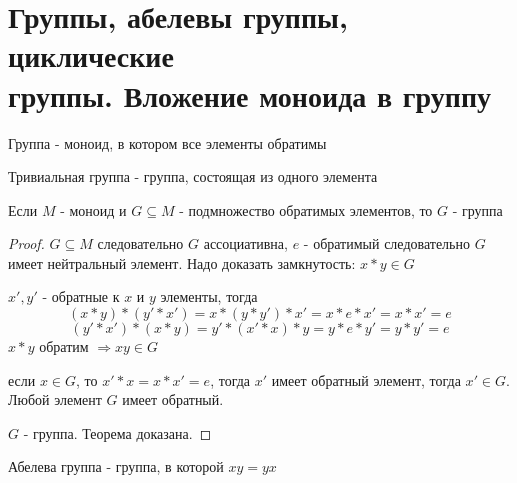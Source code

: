 \documentclass[../main/document.tex]{subfiles}
\begin{document}
\section{Группы, абелевы группы, циклические\\ группы. Вложение моноида в группу}
\begin{dfn}[Группа]
Группа - моноид, в котором все элементы обратимы
\end{dfn}
\begin{dfn}
Тривиальная группа - группа, состоящая из одного элемента
\end{dfn}
\begin{thm}
Если $M$ - моноид и $G\subseteq M$ - подмножество обратимых элементов, то $G$ - группа
\begin{proof}
$G\subseteq M$ следовательно $G$ ассоциативна, 
$e$ - обратимый следовательно $G$ имеет нейтральный элемент. 
Надо доказать замкнутость: $x*y\in G$

$x',y'$ - обратные к $x$ и $y$ элементы, тогда
$$(x*y)*(y'*x')=x*(y*y')*x'=x*e*x'=x*x'=e$$
$$(y'*x')*(x*y)=y'*(x'*x)*y=y*e*y'=y*y'=e$$
$x*y$ обратим $\Rightarrow xy\in G$

если $x\in G$, то $x'*x=x*x'=e$, тогда $x'$  имеет обратный элемент, тогда $x'\in G$. Любой элемент $G$ имеет обратный.

$G$ - группа. Теорема доказана.

\end{proof}
\end{thm}
\begin{dfn}
Абелева группа - группа, в которой $xy=yx$
\end{dfn}
\begin{dfn}
\end{dfn}
\end{document}

